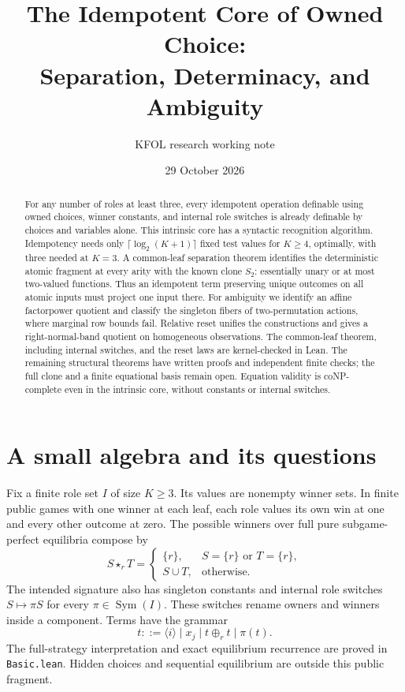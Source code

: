 \documentclass[11pt]{article}
\title{The Idempotent Core of Owned Choice:\\Separation, Determinacy, and Ambiguity}
\author{KFOL research working note}
\date{29 October 2026}
\newcommand{\ow}[1]{\mathbin{\star_{#1}}}
\newcommand{\Sym}{\operatorname{Sym}}
\begin{document}
\maketitle
\begin{abstract}
For any number of roles at least three, every idempotent operation
definable using owned choices, winner constants, and internal role
switches is already definable by choices and variables alone. This
intrinsic core has a syntactic recognition algorithm. Idempotency needs
only $\lceil\log_2(K+1)\rceil$ fixed test values for $K\geq4$, optimally,
with three needed at $K=3$. A common-leaf separation theorem identifies
the deterministic atomic fragment at every arity with the known clone
$S_2$: essentially unary or at most two-valued functions. Thus an
idempotent term preserving unique outcomes on all atomic inputs must
project one input there. For ambiguity we identify an affine factorpower
quotient and classify the singleton fibers of two-permutation actions,
where marginal row bounds fail. Relative reset unifies the constructions
and gives a right-normal-band quotient on homogeneous observations. The
common-leaf theorem, including internal switches, and the reset laws are
kernel-checked in Lean. The remaining structural theorems have written proofs
and independent finite checks; the full clone and a finite equational
basis remain open. Equation validity is coNP-complete even in the
intrinsic core, without constants or internal switches.
\end{abstract}

\section{A small algebra and its questions}

Fix a finite role set $I$ of size $K\geq3$. Its values are nonempty
winner sets. In finite public games with one winner at each leaf, each
role values its own win at one and every other outcome at zero. The
possible winners over full pure subgame-perfect equilibria compose by
\[
 S\ow r T=\begin{cases}\{r\},&S=\{r\}\text{ or }T=\{r\},\\
 S\cup T,&\text{otherwise}.\end{cases}
\]
The intended signature also has singleton constants and internal role
switches $S\mapsto\pi S$ for every $\pi\in\Sym(I)$. These switches
rename owners and winners inside a component. Terms have the grammar
\[
 t::=\langle i\rangle\mid x_j\mid t\oplus_r t\mid\pi(t).
\]
The full-strategy interpretation and exact equilibrium recurrence are
proved in \texttt{Basic.lean}. Hidden choices and sequential equilibrium
are outside this public fragment.
\end{document}
